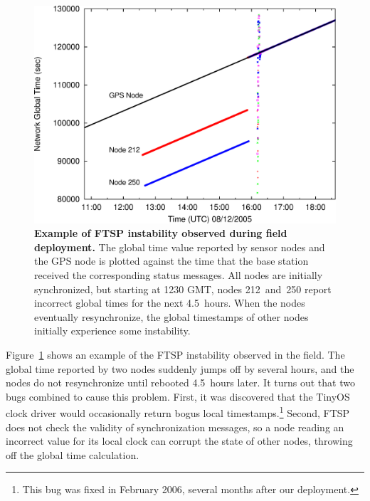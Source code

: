 \begin{figure}[t]
\begin{center}
\includegraphics[width=\hsize]{./figs/OSDI2006/2006-FTSPInstability.eps}
\end{center} 
\caption{{\bf Example of FTSP instability observed during field deployment.}
The global time value reported by sensor nodes and the GPS node is plotted
against the time that the base station received the corresponding status
messages. All nodes are initially synchronized, but starting at 1230 GMT,
nodes 212~and~250 report incorrect global times for the next 4.5~hours. When
the nodes eventually resynchronize, the global timestamps of other nodes
initially experience some instability.}
\label{fig-FTSPInstability}
\end{figure}

Figure~\ref{fig-FTSPInstability} shows an example of the FTSP instability
observed in the field. The global time reported by two nodes suddenly jumps
off by several hours, and the nodes do not resynchronize until rebooted
4.5~hours later.  It turns out that two bugs combined to cause this problem.
First, it was discovered that the TinyOS clock driver would occasionally
return bogus local timestamps.\footnote{This bug was fixed in February 2006, several
months after our deployment.} Second, FTSP does not check the validity of
synchronization messages, so a node reading an incorrect value for its local
clock can corrupt the state of other nodes, throwing off the global time
calculation.


